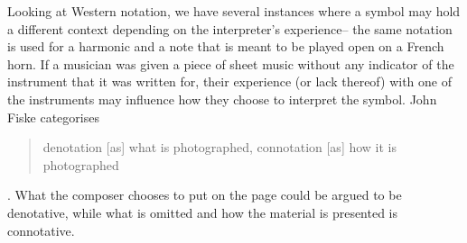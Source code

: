 Looking at Western notation, we have several instances where a symbol may hold a different context depending on the interpreter's experience-- 
the same notation is used for a harmonic and a note that is meant to be played open on a French horn.\autocite[]{schuilingNotationCulturesEthnomusicology2019}
If a musician was given a piece of sheet music without any indicator of the instrument that it was written for, their experience (or lack thereof) with one of the instruments may influence how they choose to interpret the symbol.
John Fiske categorises \begin{quotation}
    denotation [as] what is photographed, connotation [as] how it is photographed
\end{quotation}.\autocite[91]{fiskeIntroductionCommunicationStudies2011}
What the composer chooses to put on the page could be argued to be denotative, while what is omitted and how the material is presented is connotative.

